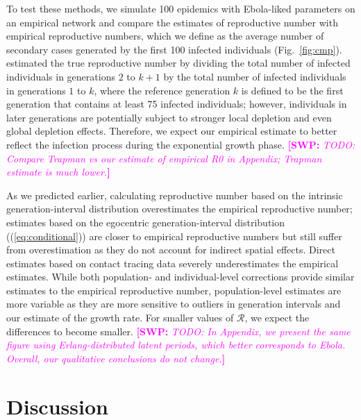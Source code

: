 \documentclass[12pt]{article}
\newcommand{\eref}[1]{(\ref{eq:#1})}
\newcommand{\fref}[1]{Fig.~\ref{fig:#1}}
\newcommand{\RR}{\ensuremath{{\mathcal R}}}
\newcommand{\comment}[3]{\textcolor{#1}{\textbf{[#2: }\textsl{#3}\textbf{]}}}
\newcommand{\swp}[1]{\comment{magenta}{SWP}{#1}}
\begin{document}
To test these methods, we simulate 100 epidemics with Ebola-liked parameters on an empirical network and compare the estimates of reproductive number with empirical reproductive numbers, which we define as the average number of secondary cases generated by the first 100 infected individuals (\fref{cmp}).
\cite{trapman2016inferring} estimated the true reproductive number by dividing the total number of infected individuals in generations $2$ to $k+1$ by the total number of infected individuals in generations $1$ to $k$, where the reference generation $k$ is defined to be the first generation that contains at least 75 infected individuals;
however, individuals in later generations are potentially subject to stronger local depletion and even global depletion effects.
Therefore, we expect our empirical estimate to better reflect the infection process during the exponential growth phase.
\swp{TODO: Compare Trapman vs our estimate of empirical R0 in Appendix; Trapman estimate is much lower.}

As we predicted earlier, calculating reproductive number based on the intrinsic generation-interval distribution overestimates the empirical reproductive number;
estimates based on the egocentric generation-interval distribution (\eref{conditional}) are closer to empirical reproductive numbers but still suffer from overestimation as they do not account for indirect spatial effects.
Direct estimates based on contact tracing data severely underestimates the empirical estimates.
While both population- and individual-level corrections provide similar estimates to the empirical reproductive number,
population-level estimates are more variable as they are more sensitive to outliers in generation intervals and our estimate of the growth rate.
For smaller values of \RR, we expect the differences to become smaller. 
\swp{TODO: In Appendix, we present the same figure using Erlang-distributed latent periods, which better corresponds to Ebola. Overall, our qualitative conclusions do not change.}

\section{Discussion}
\end{document}
